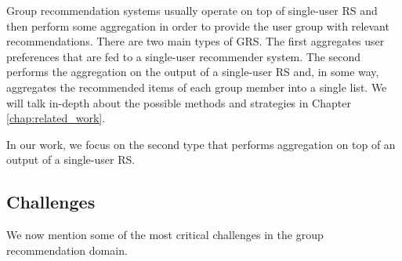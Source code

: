 Group recommendation systems usually operate on top of single-user RS and then perform some aggregation in order to provide the user group with relevant recommendations. There are two main types of GRS. The first aggregates user preferences that are fed to a single-user recommender system. The second performs the aggregation on the output of a single-user RS and, in some way, aggregates the recommended items of each group member into a single list. We will talk in-depth about the possible methods and strategies in Chapter \ref{chap:related_work}.

In our work, we focus on the second type that performs aggregation on top of an output of a single-user RS.


\subsection{Challenges}\label{subsec:01_group_rec_sys.challenges}

We now mention some of the most critical challenges in the group recommendation domain.


